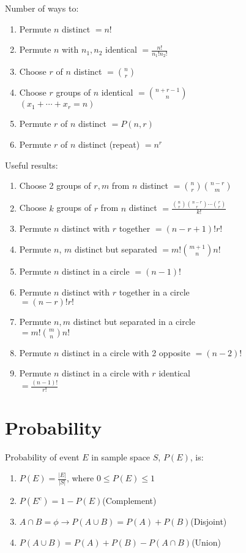 \documentclass[12pt, a4paper]{article}
\begin{document}
\begin{multicols*}{3}
Number of ways to:
\begin{enumerate}[\roman*.]
  \item Permute $n$ distinct $= n!$
  \item Permute $n$ with $n_1, n_2$ identical $= \frac{n!}{n_1!n_2!}$
  \item Choose $r$ of $n$ distinct $= \binom nr$
  \item Choose $r$ groups of $n$ identical $= \binom{n+r-1}n$\\
    $(x_1+\cdots+x_r=n)$
  \item Permute $r$ of $n$ distinct $= P(n,r)$
  \item Permute $r$ of $n$ distinct (repeat) $= n^r$
\end{enumerate}
Useful results:
\begin{enumerate}[\roman*.]
  \item Choose 2 groups of $r,m$ from $n$ distinct $= \binom nr \binom {n-r}m$
  \item Choose $k$ groups of $r$ from $n$ distinct $= \frac{\binom nr \binom{n-r}r \cdots \binom rr}{k!}$
  \item Permute $n$ distinct with $r$ together $= (n-r+1)!r!$ 
  \item Permute $n$, $m$ distinct but separated $= m! \binom{m+1}n n!$ 
  \item Permute $n$ distinct in a circle $= (n-1)!$
  \item Permute $n$ distinct with $r$ together in a circle\\$= (n-r)!r!$
  \item Permute $n, m$ distinct but separated in a circle \\$= m! \binom mn n!$
  \item Permute $n$ distinct in a circle with 2 opposite $= (n-2)!$
  \item Permute $n$ distinct in a circle with $r$ identical\\$=\frac{(n-1)!}{r!}$
\end{enumerate}

\colbreak
\section{Probability}
Probability of event $E$ in sample space $S$, $P(E)$, is:
\begin{enumerate}[\roman*.]
  \item $P(E) = \displaystyle \frac{|E|}{|S|}$, where $0 \leq P(E) \leq 1$
  \item $P(E^c) = 1 - P(E)$\hfill(Complement)
  \item $A \cap B = \phi \rightarrow P(A\cup B) = P(A) + P(B)$\hfill(Disjoint)
  \item $P(A\cup B) = P(A) + P(B)- P(A\cap B)$\hfill(Union)
\end{enumerate}


\end{multicols*}
\end{document}
